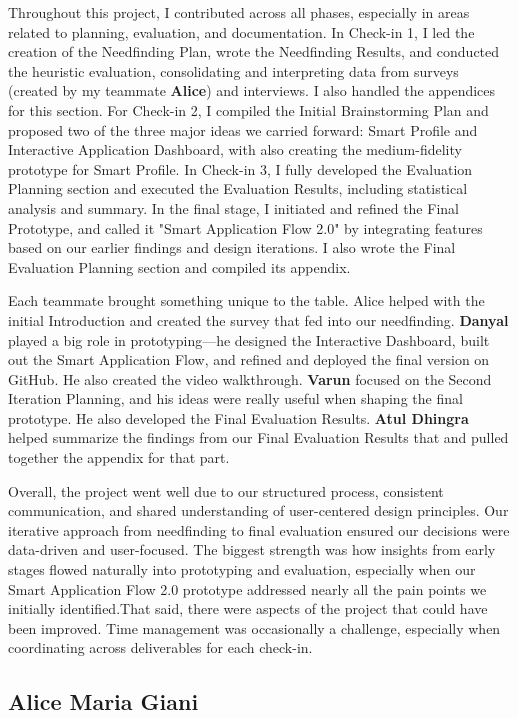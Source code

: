 \documentclass[
	letterpaper, %
]{jdf}
\begin{document}
\begin{sloppypar}
Throughout this project, I contributed across all phases, especially in areas related to planning, evaluation, and documentation. In Check-in 1, I led the creation of the Needfinding Plan, wrote the Needfinding Results, and conducted the heuristic evaluation, consolidating and interpreting data from surveys (created by my teammate \textbf{Alice}) and interviews. I also handled the appendices for this section. For Check-in 2, I compiled the Initial Brainstorming Plan and proposed two of the three major ideas we carried forward: Smart Profile and Interactive Application Dashboard, with also creating the medium-fidelity prototype for Smart Profile. In Check-in 3, I fully developed the Evaluation Planning section and executed the Evaluation Results, including statistical analysis and summary. In the final stage, I initiated and refined the Final Prototype, and called it "Smart Application Flow 2.0" by integrating features based on our earlier findings and design iterations. I also wrote the Final Evaluation Planning section and compiled its appendix.

Each teammate brought something unique to the table. Alice helped with the initial Introduction and created the survey that fed into our needfinding. \textbf{Danyal} played a big role in prototyping—he designed the Interactive Dashboard, built out the Smart Application Flow, and refined and deployed the final version on GitHub. He also created the video walkthrough. \textbf{Varun} focused on the Second Iteration Planning, and his ideas were really useful when shaping the final prototype. He also developed the Final Evaluation Results. \textbf{Atul Dhingra} helped summarize the findings from our Final Evaluation Results that and pulled together the appendix for that part. 

Overall, the project went well due to our structured process, consistent communication, and shared understanding of user-centered design principles. Our iterative approach from needfinding to final evaluation ensured our decisions were data-driven and user-focused. The biggest strength was how insights from early stages flowed naturally into prototyping and evaluation, especially when our Smart Application Flow 2.0 prototype addressed nearly all the pain points we initially identified.That said, there were aspects of the project that could have been improved. Time management was occasionally a challenge, especially when coordinating across deliverables for each check-in.

\newpage

\subsection{Alice Maria Giani}


\end{sloppypar}
\end{document}
